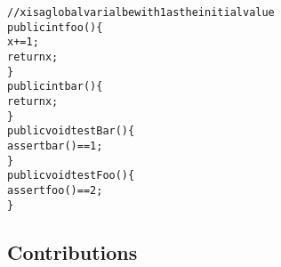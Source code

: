\begin{CodeOut}
\begin{alltt} 
//x is a global varialbe with 1 as the initial value
public int foo() \{
    x += 1;
    return x;
\}
public int bar() \{
    return x;
\}
public void testBar() \{
    assert bar() == 1;
\}
public void testFoo() \{
    assert foo() == 2;
\}
\end{alltt}
\end{CodeOut}

\subsection{Contributions}
